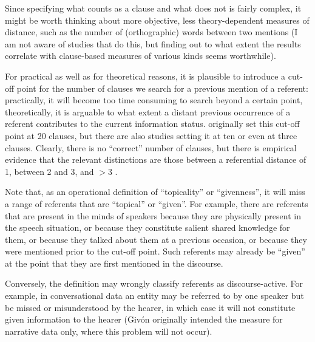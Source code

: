 Since specifying what counts as a clause and what does not is fairly complex, it might be worth thinking about more objective, less theory\hyp{}dependent measures  of distance,  such as the number of (orthographic) words between two mentions (I am not aware of studies that do this, but finding out to what extent the results correlate with clause\hyp{}based measures of various kinds seems worthwhile).

For practical as well as for theoretical reasons, it is plausible to introduce a cut\hyp{}off point for the number of clauses we search for a previous mention of a referent: practically, it will become too time consuming to search beyond a certain point, theoretically, it is arguable to what extent a distant previous occurrence of a referent contributes to the current information status. \citet{givon_topic_1983} originally set this cut\hyp{}off point at 20 clauses, but there are also studies setting it at ten or even at three clauses. Clearly, there is no ``correct'' number of clauses, but there is empirical evidence that the relevant distinctions are those between a referential distance  of 1, between 2 and 3, and $>3$ \citep[cf.][]{givon_grammar_1992}.

Note that, as an operational  definition of ``topicality''  or ``givenness'',  it will miss a range of referents that are ``topical'' or ``given''. For example, there are referents that are present in the minds of speakers because they are physically present in the speech situation, or because they constitute salient shared knowledge for them, or because they talked about them at a previous occasion, or because they were mentioned prior to the cut\hyp{}off point. Such referents may already be ``given'' at the point that they are first mentioned in the discourse.

Conversely, the definition may wrongly classify referents as discourse\hyp{}active. For example, in conversational  data an entity may be referred to by one speaker but be missed or misunderstood by the hearer, in which case it will not constitute given information to the hearer (Givón originally intended the measure  for narrative data only, where this problem will not occur).

